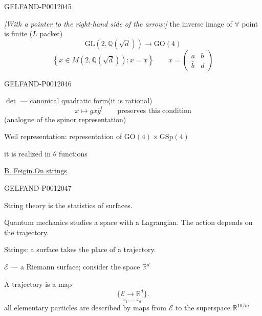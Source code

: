 \begin{GelfandAdjacentEvidence}{GELFAND-P001204}{5}


\textit{[With a pointer to the right-hand side of the arrow:]} the inverse image of \(\forall\) point is finite (\(L\) packet)
\[
\mathrm{GL}(2,\mathbb Q(\sqrt d))\longrightarrow\mathrm{GO}(4)
\]
\[
\left\{x\in M(2,\mathbb Q(\sqrt d)):x=\bar x\right\}
\qquad
x=\begin{pmatrix}a&b\\\bar b&d\end{pmatrix}
\]
\end{GelfandAdjacentEvidence}
\begin{GelfandAdjacentEvidence}{GELFAND-P001204}{6}


\(\det\) --- canonical quadratic form\quad (it is rational)
\[
x\longmapsto gx\bar g^{t}\qquad\text{preserves this condition}
\]
(analogue of the spinor representation)

Weil representation: representation of \(\mathrm{GO}(4)\times\mathrm{GSp}(4)\)

it is realized in \(\theta\) functions

\underline{\underline{B. Feigin.}}\qquad \underline{On strings}
\end{GelfandAdjacentEvidence}
\begin{GelfandAdjacentEvidence}{GELFAND-P001204}{7}


String theory is the statistics of surfaces.

Quantum mechanics studies a space with a Lagrangian. The action depends on the trajectory.

Strings: a surface takes the place of a trajectory.

\(\mathcal E\) --- a Riemann surface; consider the space \(\mathbb R^d\)

A trajectory is a map
\[
\underset{x_1,\ldots,x_d}{\{\mathcal E\longrightarrow\mathbb R^d\}}.
\]
 all elementary particles are described by maps from \(\mathcal E\) to the superspace \(\mathbb R^{10/m}\)
\end{GelfandAdjacentEvidence}
